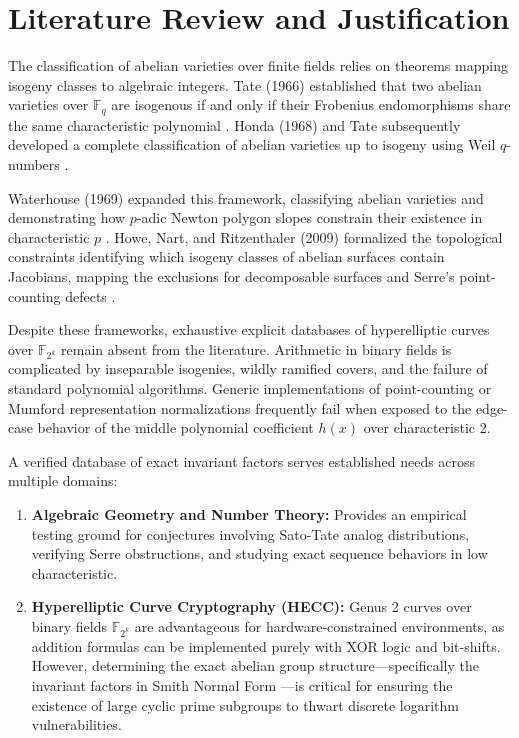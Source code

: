 \documentclass[12pt, letterpaper]{article}
\begin{document}
\section{Literature Review and Justification}
The classification of abelian varieties over finite fields relies on theorems mapping isogeny classes to algebraic integers. Tate (1966) established that two abelian varieties over $\mathbb{F}_q$ are isogenous if and only if their Frobenius endomorphisms share the same characteristic polynomial \cite{Tate1966}. Honda (1968) and Tate subsequently developed a complete classification of abelian varieties up to isogeny using Weil $q$-numbers \cite{Honda1968}. 

Waterhouse (1969) expanded this framework, classifying abelian varieties and demonstrating how $p$-adic Newton polygon slopes constrain their existence in characteristic $p$ \cite{Waterhouse1969}. Howe, Nart, and Ritzenthaler (2009) formalized the topological constraints identifying which isogeny classes of abelian surfaces contain Jacobians, mapping the exclusions for decomposable surfaces and Serre's point-counting defects \cite{Howe2009}. 

Despite these frameworks, exhaustive explicit databases of hyperelliptic curves over $\mathbb{F}_{2^k}$ remain absent from the literature. Arithmetic in binary fields is complicated by inseparable isogenies, wildly ramified covers, and the failure of standard polynomial algorithms. Generic implementations of point-counting or Mumford representation normalizations frequently fail when exposed to the edge-case behavior of the middle polynomial coefficient $h(x)$ over characteristic 2. 

A verified database of exact invariant factors serves established needs across multiple domains:
\begin{enumerate}
    \item \textbf{Algebraic Geometry and Number Theory:} Provides an empirical testing ground for conjectures involving Sato-Tate analog distributions, verifying Serre obstructions, and studying exact sequence behaviors in low characteristic.
    \item \textbf{Hyperelliptic Curve Cryptography (HECC):} Genus 2 curves over binary fields $\mathbb{F}_{2^k}$ are advantageous for hardware-constrained environments, as addition formulas can be implemented purely with XOR logic and bit-shifts. However, determining the exact abelian group structure---specifically the invariant factors in Smith Normal Form \cite{Smith1861}---is critical for ensuring the existence of large cyclic prime subgroups to thwart discrete logarithm vulnerabilities.
\end{enumerate}
\end{document}
